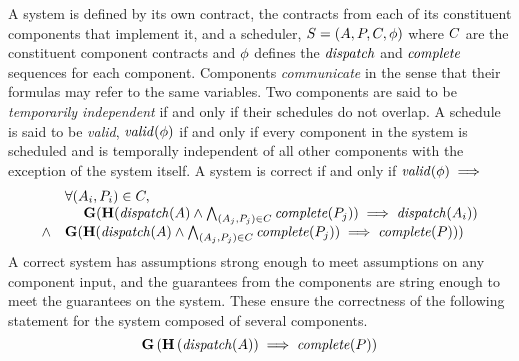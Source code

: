 A system is defined by its own contract, the contracts from each of its constituent components that implement it, and a scheduler, $S = (A, P, C, \phi)$ where $C$ are the constituent component contracts and $\phi$ defines the $\mathit{dispatch}$ and $\mathit{complete}$ sequences for each component.
Components \emph{communicate} in the sense that their formulas may refer to the same variables.
Two components are said to be \emph{temporarily independent} if and only if their schedules do not overlap.
A schedule is said to be \emph{valid}, $\mathit{valid}(\phi)$ if and only if every component in the system is scheduled and is temporally independent of all other components with the exception of the system itself. A system is correct if and only if $\mathit{valid}(\phi) \implies$
\[
\begin{array}{ll}
  & \forall (A_i, P_i) \in C, \\
  & \ \ \ \ \mathbf{G}(\mathbf{H}(\mathit{dispatch}(A) \wedge \bigwedge_{(A_j,P_j) \in C} \mathit{complete}(P_j)) \implies \mathit{dispatch}(A_i)) \\
  \wedge & 
  \mathbf{G}(\mathbf{H}(\mathit{dispatch}(A) \wedge \bigwedge_{(A_j,P_j) \in C} \mathit{complete}(P_j)) \implies \mathit{complete}(P)))
\end{array}
\]
A correct system has assumptions strong enough to meet assumptions on any component input, and the guarantees from the components are string enough to meet the guarantees on the system. These ensure the correctness of the following statement for the system composed of several components.
\[
  \mathbf{G}\left(
    \mathbf{H}\left(\mathit{dispatch}(A)\right) \implies \mathit{complete}(P) \right)
\]